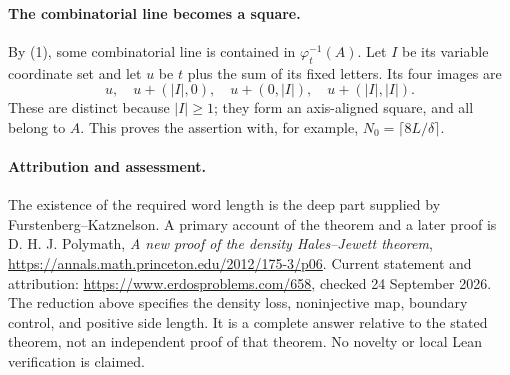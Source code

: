 \paragraph{The combinatorial line becomes a square.}
By (1), some combinatorial line is contained in \(\varphi_t^{-1}(A)\). Let \(I\) be its variable coordinate set and let \(u\) be \(t\) plus the sum of its fixed letters. Its four images are
\[
 u,\quad u+(|I|,0),\quad u+(0,|I|),\quad u+(|I|,|I|).
\]
These are distinct because \(|I|\geq1\); they form an axis-aligned square, and all belong to \(A\). This proves the assertion with, for example, \(N_0=\lceil8L/\delta\rceil\).

\paragraph{Attribution and assessment.}
The existence of the required word length is the deep part supplied by Furstenberg--Katznelson. A primary account of the theorem and a later proof is D. H. J. Polymath, \emph{A new proof of the density Hales--Jewett theorem}, \url{https://annals.math.princeton.edu/2012/175-3/p06}. Current statement and attribution: \url{https://www.erdosproblems.com/658}, checked 24 September 2026. The reduction above specifies the density loss, noninjective map, boundary control, and positive side length. It is a complete answer relative to the stated theorem, not an independent proof of that theorem. No novelty or local Lean verification is claimed.
